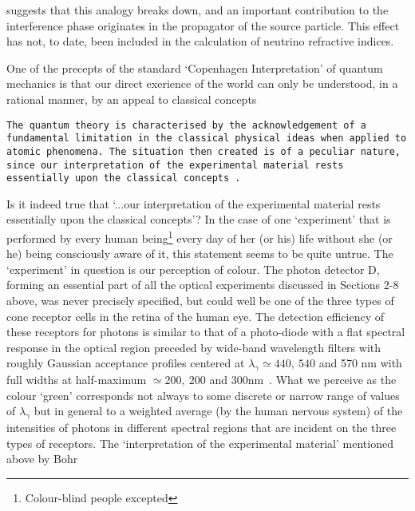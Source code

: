 {\begin{itemize}
   suggests that this analogy breaks down, and an important contribution to the interference
 phase originates in the propagator of the source particle. This effect has not, to date, been included
  in the calculation of neutrino refractive indices.
  \end{itemize}
  \par One of the precepts of the standard `Copenhagen Interpretation' of quantum mechanics is that our direct
  exerience of the world can only be understood, in a rational manner, by an appeal to classical concepts
  \par{\tt The quantum theory is characterised by the acknowledgement of a \newline fundamental limitation in the
   classical physical ideas when applied to \newline atomic phenomena. The situation then created is of a peculiar
   nature, \newline since our interpretation of the experimental material rests essentially \newline upon the
   classical concepts
    \cite{BohrCI}.}
     \par Is it indeed true that `...our interpretation of the experimental material
      rests essentially upon the classical concepts'? In the case of one `experiment' that is performed
   by every human being\footnote{Colour-blind people excepted} every day of her (or his) life
     without she (or he) being consciously aware of it,
   this statement seems to be quite untrue. 
     The `experiment' in question is our perception of colour.
    The photon detector D, forming an essential part of all the optical experiments discussed in Sections 2-8
     above, was never precisely specified, but could well be one of the three types of cone receptor cells
    in the retina of the human eye. The detection efficiency of these receptors for photons is similar
    to that of a photo-diode with a flat spectral response in the optical region preceded 
    by wide-band wavelength filters with roughly Gaussian acceptance profiles centered at $\lambda_{\gamma}
    \simeq 440,~540$ and 570 nm with full widths at half-maximum $ \simeq 200,~200$ and 300nm~\cite{PD92}.
     What we perceive as the colour `green' corresponds not always to some discrete or narrow range of
    values of  $\lambda_{\gamma}$ but in general to a weighted average (by the human nervous system)
     of the intensities of photons in different spectral regions that are incident on the three
    types of receptors. The `interpretation of the experimental material' mentioned above by Bohr
}
